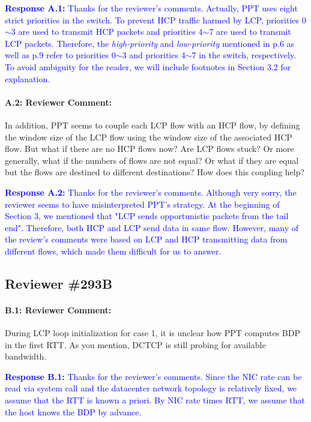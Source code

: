 \documentclass[12pt,one-column]{article}
\begin{document}
\noindent\textcolor{blue}{\textbf{Response A.1:}
Thanks for the reviewer’s comments. 
Actually, PPT uses eight strict priorities in the switch.
To prevent HCP traffic harmed by LCP, priorities 0$\sim$3 are used to transmit HCP packets and priorities 4$\sim$7 are used to transmit LCP packets.
Therefore, the \emph{high-priority} and \emph{low-priority} mentioned in p.6 as well as p.9 refer to priorities 0$\sim$3 and priorities 4$\sim$7 in the switch, respectively.
To avoid ambiguity for the reader, we will include footnotes in Section 3.2 for explanation.
}


{\it \paragraph{A.2: Reviewer Comment:} In addition, PPT seems to couple each LCP flow with an HCP flow, by defining the window size of the LCP flow using the window size of the associated HCP flow. But what if there are no HCP flows now? Are LCP flows stuck? Or more generally, what if the numbers of flows are not equal? Or what if they are equal but the flows are destined to different destinations? How does this coupling help? }	

\noindent\textcolor{blue}{\textbf{Response A.2:}
Thanks for the reviewer’s comments. 
Although very sorry, the reviewer seems to have misinterpreted  PPT's strategy.
At the beginning of Section 3, we mentioned that "LCP sends opportunistic packets from the tail end".
Therefore, both HCP and LCP send data in same flow.
However, many of the review's comments were based on LCP and HCP transmitting data from different flows, which made them difficult for us to answer.
}

\subsection{Reviewer \#293B}
{\it \paragraph{B.1: Reviewer Comment:} During LCP loop initialization for case 1, it is unclear how PPT computes BDP in the first RTT. As you mention, DCTCP is still probing for available bandwidth.}

\noindent\textcolor{blue}{\textbf{Response B.1:}
Thanks for the reviewer’s comments. 
Since the NIC rate can be read via system call and the datacenter network topology is relatively fixed, we assume that the RTT is known a priori.
By NIC rate times RTT, we assume that the host knows the BDP by advance.
}
\end{document}
